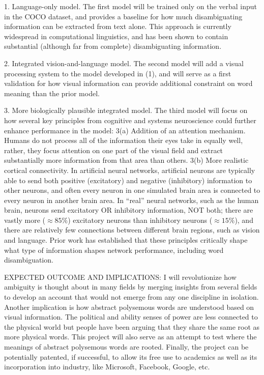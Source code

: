 \documentclass[letterpaper, 12pt]{article}
\begin{document}
1.  Language-only model. The first model will be trained only on the verbal input in the COCO dataset, and provides a baseline for how much disambiguating information can be extracted from text alone.  This approach is currently widespread in computational linguistics, and has been shown to contain substantial (although far from complete) disambiguating information. \citep{beekhuizenWhatCompanySemantically2018}

2.  Integrated vision-and-language model.  The second model will add a visual processing system to the model developed in (1), and will serve as a first validation for how visual information can provide additional constraint on word meaning than the prior model.

3.  More biologically plausible integrated model.  The third model will focus on how several key principles from cognitive and systems neuroscience could further enhance performance in the model: 3(a) Addition of an attention mechanism. Humans do not process all of the information their eyes take in equally well, rather, they focus attention on one part of the visual field and extract substantially more information from that area than others. 3(b) More realistic cortical connectivity.  In artificial neural networks, artificial neurons are typically able to send both positive (excitatory) and negative (inhibitory) information to other neurons, and often every neuron in one simulated brain area is connected to every neuron in another brain area.  In ``real'' neural networks, such as the human brain, neurons send excitatory OR inhibitory information, NOT both; there are vastly more ($\approx85\%$) excitatory neurons than inhibitory neurons ($\approx15\%$), and there are relatively few connections between different brain regions, such as vision and language. Prior work \citep{laszloPSPsERPsApplying2014, Armstrong2016Disparatesemanticambiguity} has established that these principles critically shape what type of information shapes network performance, including word disambiguation. 

EXPECTED OUTCOME AND IMPLICATIONS: I will revolutionize how ambiguity is thought about in many fields by merging insights from several fields to develop an account that would not emerge from any one discipline in isolation. Another implication is how abstract polysemous words are understood based on visual information. The political and ability senses of power are less connected to the physical world but people have been arguing that they share the same root as more physical words. This project will also serve as an attempt to test where the meanings of abstract polysemous words are rooted. Finally, the project can be potentially patented, if successful, to allow its free use to academics as well as its incorporation into industry, like Microsoft, Facebook, Google, etc.
\end{document}
